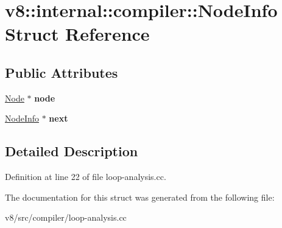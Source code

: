 \hypertarget{structv8_1_1internal_1_1compiler_1_1NodeInfo}{}\section{v8\+:\+:internal\+:\+:compiler\+:\+:Node\+Info Struct Reference}
\label{structv8_1_1internal_1_1compiler_1_1NodeInfo}
\subsection*{Public Attributes}
\begin{DoxyCompactItemize}
\item 
\mbox{\label{structv8_1_1internal_1_1compiler_1_1NodeInfo_ad53b75e8b1033c8f7f0e074714978e14}} 
\mbox{\hyperlink{classv8_1_1internal_1_1compiler_1_1Node}{Node}} $\ast$ {\bfseries node}
\item 
\mbox{\label{structv8_1_1internal_1_1compiler_1_1NodeInfo_a8a406196c168b096d076f4f2e9394bb0}} 
\mbox{\hyperlink{structv8_1_1internal_1_1compiler_1_1NodeInfo}{Node\+Info}} $\ast$ {\bfseries next}
\end{DoxyCompactItemize}


\subsection{Detailed Description}


Definition at line 22 of file loop-\/analysis.\+cc.



The documentation for this struct was generated from the following file\+:\begin{DoxyCompactItemize}
\item 
v8/src/compiler/loop-\/analysis.\+cc\end{DoxyCompactItemize}
